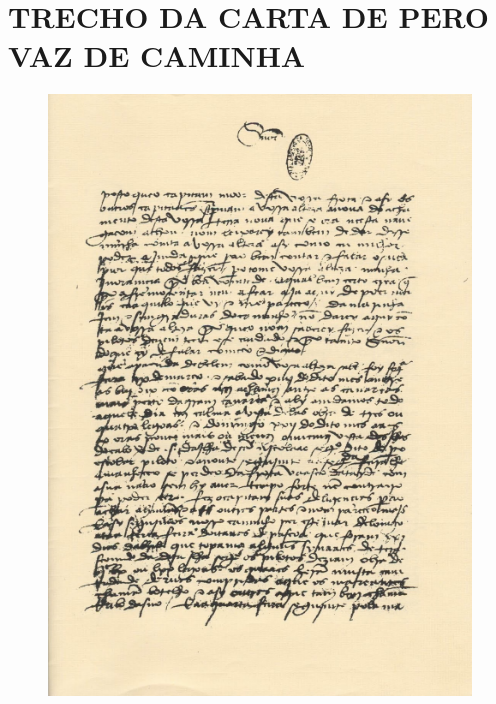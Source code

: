 \chapter{TRECHO DA CARTA DE PERO VAZ DE CAMINHA} \label{anexo:a}
\vspace{-2cm}
\begin{figure}[H]
	\caption*{}
	\begin{center}
	    \includegraphics[scale=1.0]{imagens/carta_pero_vaz.png}
	\end{center}
	
\end{figure}
